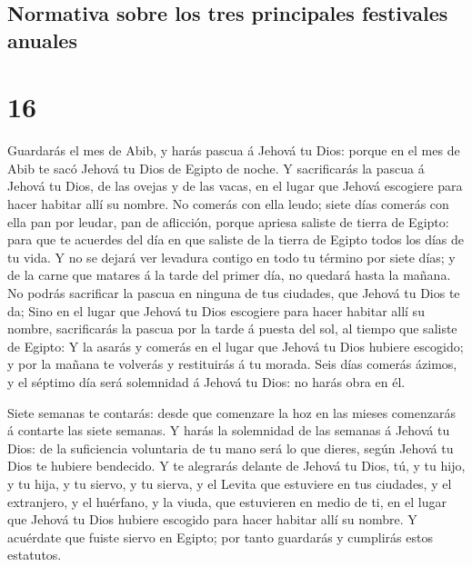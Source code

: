 \hypertarget{normativa-sobre-los-tres-principales-festivales-anuales}{%
\subsection{Normativa sobre los tres principales festivales
anuales}\label{normativa-sobre-los-tres-principales-festivales-anuales}}

\hypertarget{section-15}{%
\section{16}\label{section-15}}

 Guardarás el mes de Abib, y harás pascua á Jehová tu
Dios: porque en el mes de Abib te sacó Jehová tu Dios de Egipto de
noche.  Y sacrificarás la pascua á Jehová tu Dios, de las
ovejas y de las vacas, en el lugar que Jehová escogiere para hacer
habitar allí su nombre.  No comerás con ella leudo; siete
días comerás con ella pan por leudar, pan de aflicción, porque apriesa
saliste de tierra de Egipto: para que te acuerdes del día en que saliste
de la tierra de Egipto todos los días de tu vida.  Y no se
dejará ver levadura contigo en todo tu término por siete días; y de la
carne que matares á la tarde del primer día, no quedará hasta la mañana.
 No podrás sacrificar la pascua en ninguna de tus
ciudades, que Jehová tu Dios te da;  Sino en el lugar que
Jehová tu Dios escogiere para hacer habitar allí su nombre, sacrificarás
la pascua por la tarde á puesta del sol, al tiempo que saliste de
Egipto:  Y la asarás y comerás en el lugar que Jehová tu
Dios hubiere escogido; y por la mañana te volverás y restituirás á tu
morada.  Seis días comerás ázimos, y el séptimo día será
solemnidad á Jehová tu Dios: no harás obra en él.

 Siete semanas te contarás: desde que comenzare la hoz en
las mieses comenzarás á contarte las siete semanas.  Y
harás la solemnidad de las semanas á Jehová tu Dios: de la suficiencia
voluntaria de tu mano será lo que dieres, según Jehová tu Dios te
hubiere bendecido.  Y te alegrarás delante de Jehová tu
Dios, tú, y tu hijo, y tu hija, y tu siervo, y tu sierva, y el Levita
que estuviere en tus ciudades, y el extranjero, y el huérfano, y la
viuda, que estuvieren en medio de ti, en el lugar que Jehová tu Dios
hubiere escogido para hacer habitar allí su nombre.  Y
acuérdate que fuiste siervo en Egipto; por tanto guardarás y cumplirás
estos estatutos.

